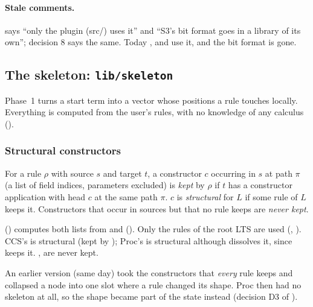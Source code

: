 \paragraph{Stale comments.}  says ``only the plugin
(src/) uses it'' and ``S3's bit format goes in a library of its own'';
 decision 8 says the same. Today
,  and  use it, and
the bit format is gone.

\subsection{The skeleton: \texttt{lib/skeleton}}\label{sec:sym-skeleton}

Phase~1 turns a start term into a vector whose positions a rule touches
locally. Everything is computed from the user's rules, with no knowledge
of any calculus ().

\subsubsection{Structural constructors}

\begin{definition}[Structural]
For a rule $\rho$ with source $s$ and target $t$, a constructor $c$
occurring in $s$ at path $\pi$ (a list of field indices, parameters
excluded) is \emph{kept} by $\rho$ if $t$ has a constructor application
with head $c$ at the same path $\pi$. $c$ is \emph{structural} for $L$ if
some rule of $L$ keeps it. Constructors that occur in sources but that no
rule keeps are \emph{never kept}.
\end{definition}

 () computes both
lists from  and 
(). Only the rules of the root LTS
are used (, ).
CCS's  is structural (kept by ); Proc's 
is structural although  dissolves it, since
 keeps it. ,  are never kept.

An earlier version (same day) took the constructors that \emph{every} rule
keeps and collapsed a node into one slot where a rule changed its shape.
Proc then had no skeleton at all, so the shape became part of the state
instead (decision D3 of ).

